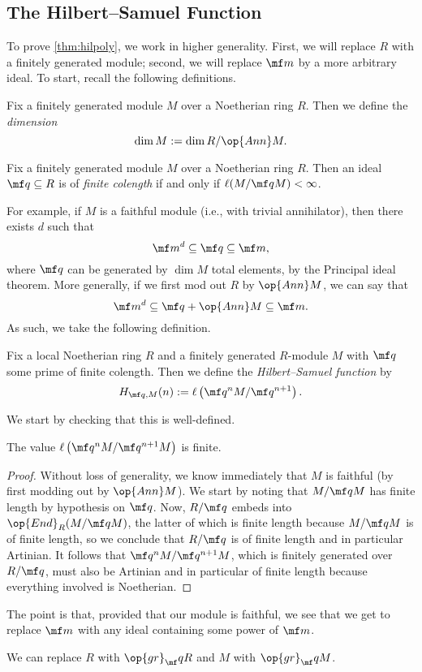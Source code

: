 \subsection{The Hilbert--Samuel Function}
To prove \autoref{thm:hilpoly}, we work in higher generality. First, we will replace $R$ with a finitely generated module; second, we will replace $\mf m$ by a more arbitrary ideal. To start, recall the following definitions.
\begin{definition}
	Fix a finitely generated module $M$ over a Noetherian ring $R$. Then we define the \textit{dimension}
	\[\dim M:=\dim R/\op{Ann}M.\]
\end{definition}
\begin{definition}
	Fix a finitely generated module $M$ over a Noetherian ring $R$. Then an ideal $\mf q\subseteq R$ is of \textit{finite colength} if and only if $\ell(M/\mf qM)<\infty$.
\end{definition}
For example, if $M$ is a faithful module (i.e., with trivial annihilator), then there exists $d$ such that
\[\mf m^d\subseteq\mf q\subseteq\mf m,\]
where $\mf q$ can be generated by $\dim M$ total elements, by the Principal ideal theorem. More generally, if we first mod out $R$ by $\op{Ann}M$, we can say that
\[\mf m^d\subseteq\mf q+\op{Ann}M\subseteq\mf m.\]
As such, we take the following definition.
\begin{definition}
	Fix a local Noetherian ring $R$ and a finitely generated $R$-module $M$ with $\mf q$ some prime of finite colength. Then we define the \textit{Hilbert--Samuel function} by
	\[H_{\mf q,M}(n):=\ell\left(\mf q^nM/\mf q^{n+1}\right).\]
\end{definition}
We start by checking that this is well-defined.
\begin{lemma}
	The value $\ell\left(\mf q^nM/\mf q^{n+1}M\right)$ is finite.
\end{lemma}
\begin{proof}
	Without loss of generality, we know immediately that $M$ is faithful (by first modding out by $\op{Ann}M$). We start by noting that $M/\mf qM$ has finite length by hypothesis on $\mf q$. Now, $R/\mf q$ embeds into $\op{End}_R(M/\mf qM)$, the latter of which is finite length because $M/\mf qM$ is of finite length, so we conclude that $R/\mf q$ is of finite length and in particular Artinian. It follows that $\mf q^nM/\mf q^{n+1}M$, which is finitely generated over $R/\mf q$, must also be Artinian and in particular of finite length because everything involved is Noetherian.
\end{proof}
The point is that, provided that our module is faithful, we see that we get to replace $\mf m$ with any ideal containing some power of $\mf m$.
\begin{remark}
	We can replace $R$ with $\op{gr}_\mf qR$ and $M$ with $\op{gr}_\mf qM$.
\end{remark}

